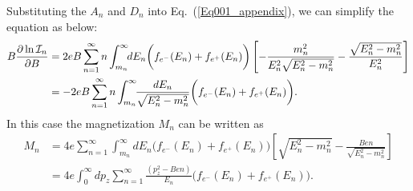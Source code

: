 \documentclass[sn-mathphys,Numbered]{sn-jnl}
\begin{document}
Substituting the $A_n$ and $D_n$ into Eq.~(\ref{Eq001_appendix}), we can simplify the equation as below:
\begin{align}
B\frac{\partial\ln\mathcal{I}_n}{\partial B}
&=2eB\sum_{n=1}^\infty n\int_{m_n}^\infty\!\!dE_n \bigg(f_{e^-}(E_n)+f_{e^+}(E_n)\bigg)\left[-\frac{m^2_n}{E^2_{n}\sqrt{E^2_n-m^2_n}}-\frac{\sqrt{E^2_n-m^2_n}}{E^2_{n}}\right]\notag\\
&=-2eB\sum_{n=1}^\infty n\int_{m_n}^\infty\!\!\frac{dE_n}{\sqrt{E^2_n-m^2_n}} \bigg(f_{e^-}(E_n)+f_{e^+}(E_n)\bigg).
\end{align}
In this case the magnetization $M_n$ can be written as
\begin{align}
M_n&=4e\sum_{n=1}^\infty \int_{m_n}^\infty\!\!dE_n\bigg(f_{e^-}(E_n)+f_{e^+}(E_n)\bigg)\left[{\sqrt{E^2_n-m^2_n}}-\frac{Ben}{\sqrt{E^2_n-m^2_n}}\right]\\
&=4e \int_{0}^\infty\!\!dp_z\sum_{n=1}^\infty\frac{(p_z^2-Ben)}{E_n}\bigg(f_{e^-}(E_n)+f_{e^+}(E_n)\bigg).
\end{align}

\end{document}
